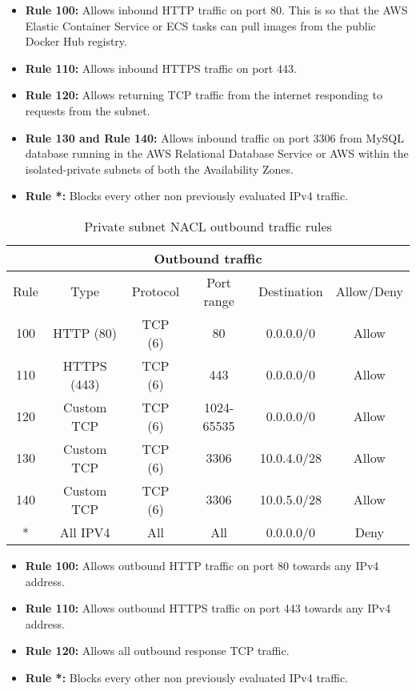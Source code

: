 \begin{itemize}
    \item \textbf{Rule 100:} Allows inbound HTTP traffic on port 80. This is so that the AWS Elastic Container Service or ECS tasks can pull images from the public Docker Hub registry.
    \item \textbf{Rule 110:} Allows inbound HTTPS traffic on port 443.
    \item \textbf{Rule 120:} Allows returning TCP traffic from the internet responding to requests from the subnet.
    \item \textbf{Rule 130 and Rule 140:} Allows inbound traffic on port 3306 from MySQL database running in the AWS Relational Database Service or AWS within the isolated-private subnets of both the Availability Zones.
    \item \textbf{Rule *:} Blocks every other non previously evaluated IPv4 traffic.
\end{itemize}

\begin{table}[H]
    \centering
    \begin{tabular}{|c|c|c|c|c|c|}
        \hline
        \multicolumn{6}{|c|}{Outbound traffic}                                \\
        \hline
        Rule & Type        & Protocol & Port range & Destination & Allow/Deny \\
        \hline
        100  & HTTP (80)   & TCP (6)  & 80         & 0.0.0.0/0   & Allow      \\
        \hline
        110  & HTTPS (443) & TCP (6)  & 443        & 0.0.0.0/0   & Allow      \\
        \hline
        120  & Custom TCP  & TCP (6)  & 1024-65535 & 0.0.0.0/0   & Allow      \\
        \hline
        130  & Custom TCP  & TCP (6)  & 3306       & 10.0.4.0/28 & Allow      \\
        \hline
        140  & Custom TCP  & TCP (6)  & 3306       & 10.0.5.0/28 & Allow      \\
        \hline
        *    & All IPV4    & All      & All        & 0.0.0.0/0   & Deny       \\
        \hline
    \end{tabular}
    \caption{Private subnet NACL outbound traffic rules}
    \label{table:private-subnet-outbound}
\end{table}

\begin{itemize}
    \item \textbf{Rule 100:} Allows outbound HTTP traffic on port 80 towards any IPv4 address.
    \item \textbf{Rule 110:} Allows outbound HTTPS traffic on port 443 towards any IPv4 address.
    \item \textbf{Rule 120:} Allows all outbound response TCP traffic.
    \item \textbf{Rule *:} Blocks every other non previously evaluated IPv4 traffic.
\end{itemize}

